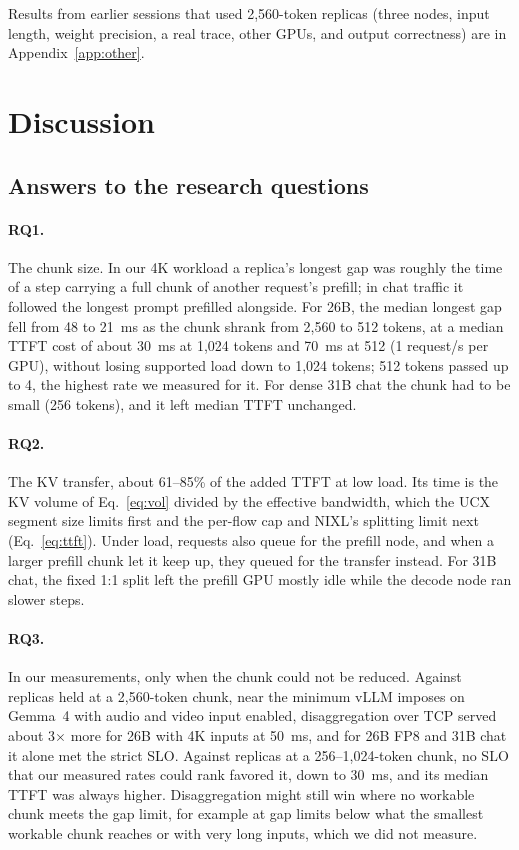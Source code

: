 \documentclass[11pt]{article}
\begin{document}
Results from earlier sessions that used 2,560-token replicas (three nodes, input length, weight precision, a real trace, other GPUs, and output correctness) are in Appendix~\ref{app:other}.

\section{Discussion}

\subsection{Answers to the research questions}

\paragraph{RQ1.} The chunk size. In our 4K workload a replica's longest gap was roughly the time of a step carrying a full chunk of another request's prefill; in chat traffic it followed the longest prompt prefilled alongside. For 26B, the median longest gap fell from 48 to 21~ms as the chunk shrank from 2,560 to 512 tokens, at a median TTFT cost of about 30~ms at 1,024 tokens and 70~ms at 512 (1 request/s per GPU), without losing supported load down to 1,024 tokens; 512 tokens passed up to 4, the highest rate we measured for it. For dense 31B chat the chunk had to be small (256 tokens), and it left median TTFT unchanged.

\paragraph{RQ2.} The KV transfer, about 61--85\% of the added TTFT at low load. Its time is the KV volume of Eq.~\eqref{eq:vol} divided by the effective bandwidth, which the UCX segment size limits first and the per-flow cap and NIXL's splitting limit next (Eq.~\eqref{eq:ttft}). Under load, requests also queue for the prefill node, and when a larger prefill chunk let it keep up, they queued for the transfer instead. For 31B chat, the fixed 1:1 split left the prefill GPU mostly idle while the decode node ran slower steps.

\paragraph{RQ3.} In our measurements, only when the chunk could not be reduced. Against replicas held at a 2,560-token chunk, near the minimum vLLM imposes on Gemma~4 with audio and video input enabled, disaggregation over TCP served about 3$\times$ more for 26B with 4K inputs at 50~ms, and for 26B FP8 and 31B chat it alone met the strict SLO. Against replicas at a 256--1,024-token chunk, no SLO that our measured rates could rank favored it, down to 30~ms, and its median TTFT was always higher. Disaggregation might still win where no workable chunk meets the gap limit, for example at gap limits below what the smallest workable chunk reaches or with very long inputs, which we did not measure.
\end{document}
